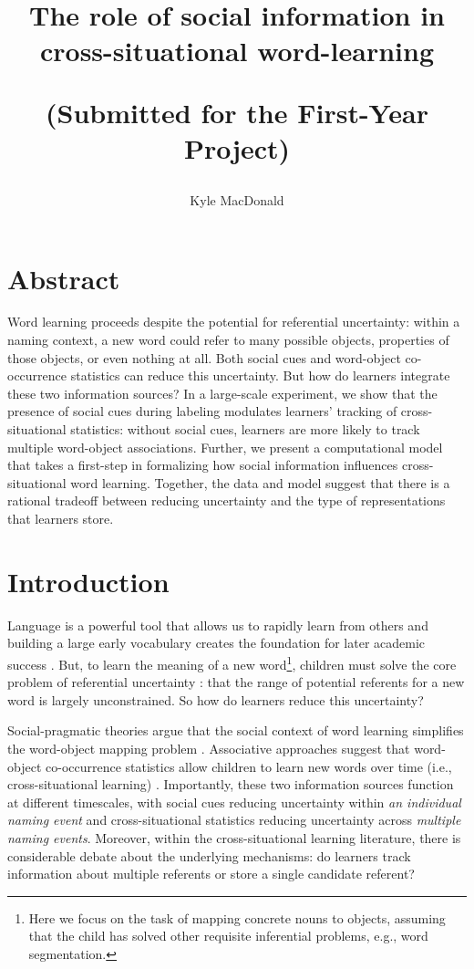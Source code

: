 \documentclass[man]{apa2}
\title{The role of social information in cross-situational word-learning

(Submitted for the First-Year Project)}
\author{Kyle MacDonald}
\affiliation{Department of Psychology, Stanford University}
\begin{document}
\maketitle


\section{Abstract}

Word learning proceeds despite the potential for referential uncertainty: within a naming context, a new word could refer to many possible objects, properties of those objects, or even nothing at all. Both social cues and word-object co-occurrence statistics can reduce this uncertainty. But how do learners integrate these two information sources? In a large-scale experiment, we show that the presence of social cues during labeling modulates learners' tracking of cross-situational statistics: without social cues, learners are more likely to track multiple word-object associations. Further, we present a computational model that takes a first-step in formalizing how social information influences cross-situational word learning. Together, the data and model suggest that there is a rational tradeoff between reducing uncertainty and the type of representations that learners store.  

\newpage


\section{Introduction}
Language is a powerful tool that allows us to rapidly learn from others and building a large early vocabulary creates the foundation for later academic success \cite{hart1995meaningful, qian2002investigating}. But, to learn the meaning of a new word\footnote{Here we focus on the task of mapping concrete nouns to objects, assuming that the child has solved other requisite inferential problems, e.g., word segmentation.}, children must solve the core problem of referential uncertainty \cite{quine19600}: that the range of potential referents for a new word is largely unconstrained. So how do learners reduce this uncertainty?

Social-pragmatic theories argue that the social context of word learning simplifies the word-object mapping problem \cite{bloom2002children, tomasello2009constructing}. Associative approaches suggest that word-object co-occurrence statistics allow children to learn new words over time (i.e., cross-situational learning) \cite{smith2008infants}. Importantly, these two information sources function at different timescales, with social cues reducing uncertainty within \emph{an individual naming event} and cross-situational statistics reducing uncertainty across \emph{multiple naming events}. Moreover, within the cross-situational learning literature, there is considerable debate about the underlying mechanisms: do learners track information about multiple referents or store a single candidate referent?
\end{document}
